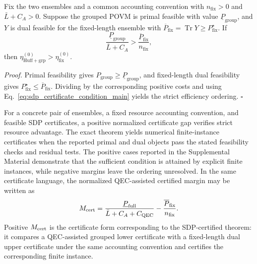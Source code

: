 \begin{proposition}\label{thm:sdp-resource}
Fix the two ensembles and a common accounting convention with $n_{\mathrm{fix}}>0$ and $\bar L+C_A>0$. Suppose the grouped POVM is primal feasible with value $\underline P_{\mathrm{group}}$, and $Y$ is dual feasible for the fixed-length ensemble with $\overline P_{\mathrm{fix}}=\operatorname{Tr}Y\ge P^\star_{\mathrm{fix}}$. If
\begin{equation}
    \frac{\underline P_{\mathrm{group}}}{\bar L+C_A}>
    \frac{\overline P_{\mathrm{fix}}}{n_{\mathrm{fix}}},
    \label{eq:sdp_certificate_condition_main}
\end{equation}
then $\eta_{\mathrm{Huff+grp}}^{(0)}>\eta_{\mathrm{fix}}^{(0)}$.
\end{proposition}
\textit{Proof.} Primal feasibility gives $P_{\mathrm{group}}\ge\underline P_{\mathrm{group}}$, and fixed-length dual feasibility gives $P^\star_{\mathrm{fix}}\le\overline P_{\mathrm{fix}}$. Dividing by the corresponding positive costs and using Eq.~\eqref{eq:sdp_certificate_condition_main} yields the strict efficiency ordering. \(\square\)

For a concrete pair of ensembles, a fixed resource accounting convention, and feasible SDP certificates, a positive normalized certificate gap verifies strict resource advantage. The exact theorem yields numerical finite-instance certificates when the reported primal and dual objects pass the stated feasibility checks and residual tests. The positive cases reported in the Supplemental Material demonstrate that the sufficient condition is attained by explicit finite instances, while negative margins leave the ordering unresolved.
In the same certificate language, the normalized QEC-assisted certified margin may be written as
\begin{equation}
    M_{\rm cert}
    =
    \frac{\underline P_{\mathrm{full}}}{\bar L+C_A+C_{\mathrm{QEC}}}
    -
    \frac{\overline P_{\mathrm{fix}}}{n_{\mathrm{fix}}}.
    \label{eq:certified_margin_main}
\end{equation}
Positive \(M_{\rm cert}\) is the certificate form corresponding to the SDP-certified theorem: it compares a QEC-assisted grouped lower certificate with a fixed-length dual upper certificate under the same accounting convention and certifies the corresponding finite instance.

